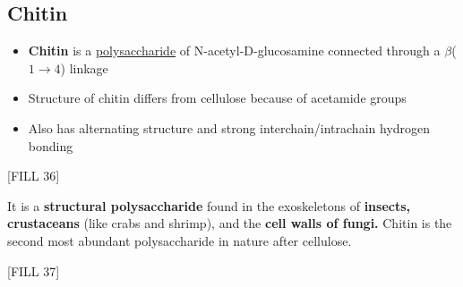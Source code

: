 \documentclass[10pt]{article}
\begin{document}
\subsection*{Chitin}
\begin{itemize}
    \item \textbf{Chitin} is a \underline{polysaccharide} of N-acetyl-D-glucosamine connected through a $\beta$($1 \rightarrow 4$) linkage
    \item Structure of chitin differs from cellulose because of acetamide groups
    \item Also has alternating structure and strong interchain/intrachain hydrogen bonding
\end{itemize}
\begin{center}
    [FILL 36]
\end{center}
It is a \textbf{structural polysaccharide} found in the exoskeletons of \textbf{insects, crustaceans} (like crabs and shrimp), and the \textbf{cell walls of fungi.}  Chitin is the second most abundant polysaccharide in nature after cellulose.
\begin{center}
    [FILL 37]
\end{center}
\end{document}
